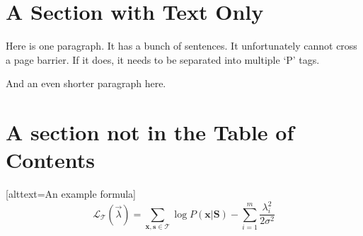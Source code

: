 \documentclass{article}
\begin{document}
\newpage

\section[Short Title]{A Section with Text Only}

Here is one paragraph. It has a bunch of sentences. It unfortunately cannot cross a page barrier. If it does, it needs to be separated into multiple `P' tags.
\CloseStructMc{}

And an even shorter paragraph here.
\CloseStructMc

\section*{A section not in the Table of Contents}

[alttext=An example formula]
\begin{equation} \textstyle
  \mathcal{L}_{\mathcal{T}}(\vec{\lambda}) = \sum_{\mathbf{x},\mathbf{s}\in\mathcal{T}} \log P(\mathbf{x}|\mathbf{S}) - \sum_{i=1}^m \frac{\lambda_i^2}{2\sigma^2}
\end{equation}
\CloseStructMc


%
%
%
%
%
%
\end{document}
